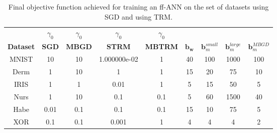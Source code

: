 \documentclass[letterpaper,12pt,titlepage,oneside,final]{book}
\let\origdoublepage\cleardoublepage
\newcommand{\clearemptydoublepage}{%
	\clearpage{\pagestyle{empty}\origdoublepage}}
\let\cleardoublepage\clearemptydoublepage
\begin{document}
	
	\begin{table}[h]
		\centering
		\begin{tabular}{ |c|c|c|c|c|c|c|c|c| }  
			\hline
			 & $\gamma_{0}$ & $\gamma_{0}$ & $\gamma_{0}$ & $\gamma_{0}$ &  &  &  &  \\
			\textbf{Dataset} & \textbf{SGD} & \textbf{MBGD} & \textbf{STRM} & \textbf{MBTRM} & $\mathbf{b_{w}}$ & $\mathbf{b}_{m}^{small}$ & $\mathbf{b}_{m}^{large}$ & $\mathbf{b}_{m}^{MBGD}$ \\
			
			\hline
			MNIST & 10 & 10 & 1.000000e-02 & 1 & 40 & 100 & 1000 & 100 \\
			\hline
			Derm & 1 & 10 & 1 & 1 & 15 & 20 & 75 & 10\\
			\hline
			IRIS & 1 & 1 & 0.01 & 1 & 5 & 15 & 50 & 5\\
			\hline
			Nurs & 1 & 10 & 0.1 & 0.1 & 5 & 60 & 1500 & 40\\
			\hline
			Habe & 0.01 & 0.1 & 0.1 & 0.1 & 15 & 10 & 75 & 5 \\ 
			\hline
			XOR & 0.1 & 0.1 & 0.001 & 1 & 4 & 4 & 4 & 2\\
			\hline
		\end{tabular}
		\caption{Final objective function achieved for training an ff-ANN on the set of datasets using SGD and using TRM.}
		\label{table:hyperparam}
	\end{table}
	
	
	
	
	\cleardoublepage %
	\renewcommand*{\bibname}{References}
	
	
	
	
	\nocite{*}
	
\end{document}
